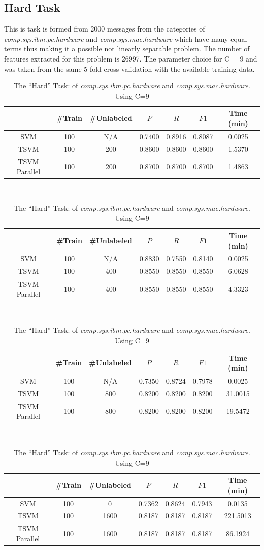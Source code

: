 \subsection{Hard Task}

This is task is formed from 2000 messages from the categories of \emph{comp.sys.ibm.pc.hardware}
and\emph{ comp.sys.mac.hardware} which have many equal terms thus
making it a possible not linearly separable problem. The number of
features extracted for this problem is 26997. The parameter choice
for C = 9 and was taken from the same 5-fold cross-validation with
the available training data.

%
\begin{table}
\begin{longtable}
\begin{tabular}{|c|c|c|c|c|c||c|}
\hline
 & \#Train & \#Unlabeled & $P$  & $R$  & $F1$  & Time (min)\tabularnewline
\hline 
SVM & 100 & N/A & 0.7400 & 0.8916 & 0.8087 & 0.0025\tabularnewline
\hline 
TSVM & 100 & 200 & 0.8600 & 0.8600 & 0.8600 & 1.5370\tabularnewline
\hline 
TSVM Parallel & 100 & 200 & 0.8700 & 0.8700 & 0.8700 & 1.4863\tabularnewline
\hline
\end{tabular} \\
\tabularnewline
\tabularnewline
\begin{tabular}{|c|c|c|c|c|c||c|}
\hline 
 & \#Train & \#Unlabeled & $P$  & $R$  & $F1$  & Time (min)\tabularnewline
\hline 
SVM & 100 & N/A & 0.8830 & 0.7550 & 0.8140 & 0.0025\tabularnewline
\hline 
TSVM & 100 & 400 & 0.8550 & 0.8550 & 0.8550 & 6.0628\tabularnewline
\hline 
TSVM Parallel & 100 & 400 & 0.8550 & 0.8550 & 0.8550 & 4.3323\tabularnewline
\hline
\end{tabular} \\
\tabularnewline
\tabularnewline
\begin{tabular}{|c|c|c|c|c|c||c|}
\hline 
 & \#Train & \#Unlabeled & $P$  & $R$  & $F1$  & Time (min)\tabularnewline
\hline
\hline 
SVM & 100 & N/A & 0.7350 & 0.8724 & 0.7978 & 0.0025\tabularnewline
\hline 
TSVM & 100 & 800 & 0.8200 & 0.8200 & 0.8200 & 31.0015\tabularnewline
\hline 
TSVM Parallel & 100 & 800 & 0.8200 & 0.8200 & 0.8200 & 19.5472\tabularnewline
\hline
\end{tabular} \\
\tabularnewline
\tabularnewline
\begin{tabular}{|c|c|c|c|c|c||c|}
\hline 
 & \#Train & \#Unlabeled & $P$  & $R$  & $F1$  & Time (min)\tabularnewline
\hline
\hline 
SVM & 100 & 0 & 0.7362 & 0.8624 & 0.7943 & 0.0135\tabularnewline
\hline 
TSVM & 100 & 1600 & 0.8187 & 0.8187 & 0.8187 & 221.5013\tabularnewline
\hline 
TSVM Parallel & 100 & 1600 & 0.8187 & 0.8187 & 0.8187 & 86.1924\tabularnewline
\hline
\end{tabular}\tabularnewline
\tabularnewline
\tabularnewline
\tabularnewline
\end{longtable}

\caption{The {}``Hard'' Task:\emph{ }of \emph{comp.sys.ibm.pc.hardware} and\emph{
comp.sys.mac.hardware}. Using C=9 \label{tab:Hard-Task:comp.graphics-and} }

\end{table}

